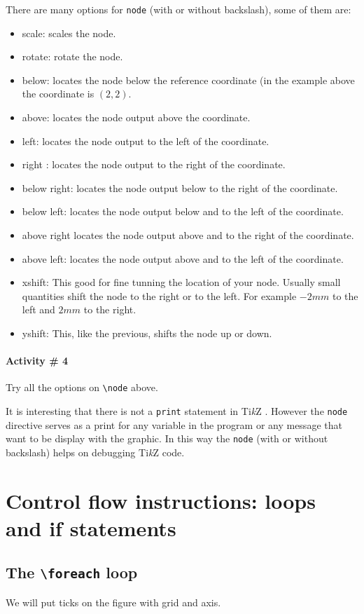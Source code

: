 \documentclass[12pt]{article}
\newcommand{\myTikZ}{Ti\textit{k}Z }
\begin{document}
There are many options for \texttt{node} (with or without backslash), some of them are:
\begin{itemize}
  \item scale: scales the node.
  \item rotate: rotate the node.
  \item below: locates the node below the reference coordinate (in the example above the
      coordinate is $(2,2)$.
    \item above: locates the node output above the coordinate.
    \item left: locates the node output to the left of the coordinate.
    \item right : locates the node output to the right of the coordinate.
  \item below right: locates the node output below to the right of the coordinate.
  \item below left: locates the node output below and to the left of the coordinate.
  \item above  right locates the node output above and to the right of the coordinate.
  \item above  left: locates the node output above and to the left of the coordinate.
  \item xshift: This good for fine tunning the location of your node. Usually small quantities
    shift the node to the right or to the left. For example $-2mm$ to the left and $2mm$ to the
    right.
  \item yshift: This, like the previous, shifts the node up or down.
\end{itemize}

\paragraph{Activity \#  4}
Try all the options on \texttt{\textbackslash node} above.

It is interesting that there is not a \texttt{print} statement in \myTikZ. However
the \texttt{node} directive serves as a print for any variable in the program or any 
message that want to be display with the graphic. In this way the \texttt{node} 
(with or without backslash) helps on debugging \myTikZ code.

\section{Control flow instructions: loops and if statements}
\subsection{The \texttt{\textbackslash foreach} loop}
We will put ticks on the figure with grid and axis.
\end{document}
